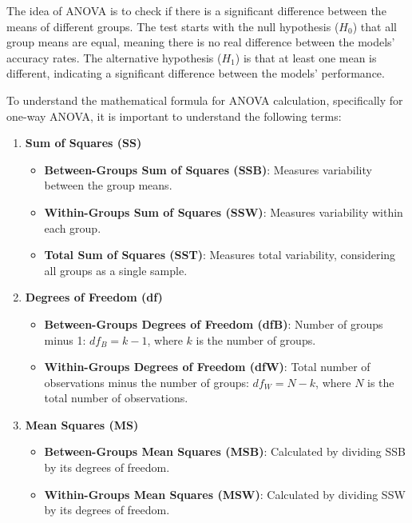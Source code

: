 \documentclass[conference]{IEEEtran}
\begin{document}
    The idea of ANOVA is to check if there is a significant difference between the means of different groups. The test starts with the null hypothesis ($H_0$) that all group means are equal, meaning there is no real difference between the models' accuracy rates. The alternative hypothesis ($H_1$) is that at least one mean is different, indicating a significant difference between the models' performance.
    
    To understand the mathematical formula for ANOVA calculation, specifically for one-way ANOVA, it is important to understand the following terms:
    
    \begin{enumerate}
        \item \textbf{Sum of Squares (SS)}
        \begin{itemize}
            \item \textbf{Between-Groups Sum of Squares (SSB)}: Measures variability between the group means.
            \item \textbf{Within-Groups Sum of Squares (SSW)}: Measures variability within each group.
            \item \textbf{Total Sum of Squares (SST)}: Measures total variability, considering all groups as a single sample.
        \end{itemize}
        \item \textbf{Degrees of Freedom (df)}
        \begin{itemize}
            \item \textbf{Between-Groups Degrees of Freedom (dfB)}: Number of groups minus 1: \( df_B = k - 1 \), where \( k \) is the number of groups.
            \item \textbf{Within-Groups Degrees of Freedom (dfW)}: Total number of observations minus the number of groups: \( df_W = N - k \), where \( N \) is the total number of observations.
        \end{itemize}
        \item \textbf{Mean Squares (MS)}
        \begin{itemize}
            \item \textbf{Between-Groups Mean Squares (MSB)}: Calculated by dividing SSB by its degrees of freedom.
            \item \textbf{Within-Groups Mean Squares (MSW)}: Calculated by dividing SSW by its degrees of freedom.
        \end{itemize}
    \end{enumerate}
    
\end{document}
